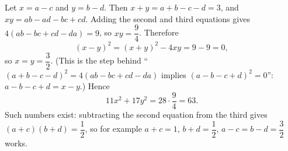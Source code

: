 Let \(x=a-c\) and \(y=b-d\). Then \(x+y=a+b-c-d=3\), and \(xy=ab-ad-bc+cd\). Adding the second and third equations gives \(4(ab-bc+cd-da)=9\), so \(xy=\dfrac{9}{4}\). Therefore
\[
(x-y)^2=(x+y)^2-4xy=9-9=0,
\]
so \(x=y=\dfrac{3}{2}\). (This is the step behind ``\((a+b-c-d)^2=4(ab-bc+cd-da)\) implies \((a-b-c+d)^2=0\)'': \(a-b-c+d=x-y\).) Hence
\[
11x^2+17y^2=28\cdot\dfrac{9}{4}=\boxed{63}.
\]
Such numbers exist: subtracting the second equation from the third gives \((a+c)(b+d)=\dfrac{1}{2}\), so for example \(a+c=1\), \(b+d=\dfrac{1}{2}\), \(a-c=b-d=\dfrac{3}{2}\) works.
